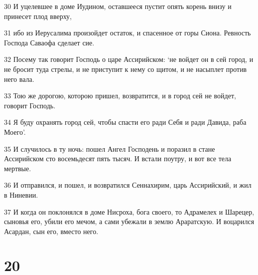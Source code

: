 \par 30 И уцелевшее в доме Иудином, оставшееся пустит опять корень внизу и принесет плод вверху,
\par 31 ибо из Иерусалима произойдет остаток, и спасенное от горы Сиона. Ревность Господа Саваофа сделает сие.
\par 32 Посему так говорит Господь о царе Ассирийском: `не войдет он в сей город, и не бросит туда стрелы, и не приступит к нему со щитом, и не насыплет против него вала.
\par 33 Тою же дорогою, которою пришел, возвратится, и в город сей не войдет, говорит Господь.
\par 34 Я буду охранять город сей, чтобы спасти его ради Себя и ради Давида, раба Моего'.
\par 35 И случилось в ту ночь: пошел Ангел Господень и поразил в стане Ассирийском сто восемьдесят пять тысяч. И встали поутру, и вот все тела мертвые.
\par 36 И отправился, и пошел, и возвратился Сеннахирим, царь Ассирийский, и жил в Ниневии.
\par 37 И когда он поклонялся в доме Нисроха, бога своего, то Адрамелех и Шарецер, сыновья его, убили его мечом, а сами убежали в землю Араратскую. И воцарился Асардан, сын его, вместо него.

\chapter{20}

